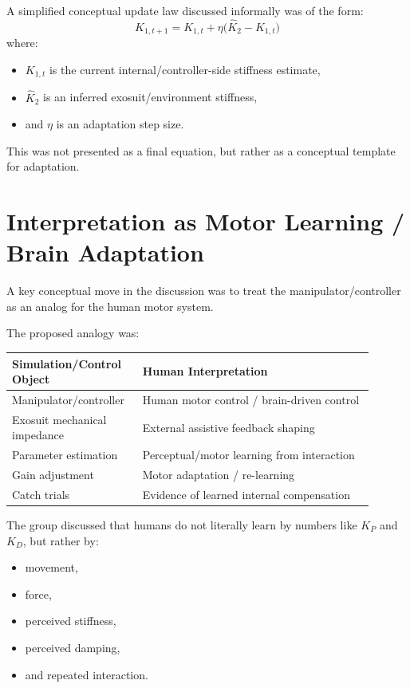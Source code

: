 \documentclass[11pt]{article}
\begin{document}
A simplified conceptual update law discussed informally was of the form:
\[
K_{1,t+1} = K_{1,t} + \eta\bigl(\hat{K}_2 - K_{1,t}\bigr)
\]
where:
\begin{itemize}[leftmargin=1.5em]
    \item \(K_{1,t}\) is the current internal/controller-side stiffness estimate,
    \item \(\hat{K}_2\) is an inferred exosuit/environment stiffness,
    \item and \(\eta\) is an adaptation step size.
\end{itemize}

This was not presented as a final equation, but rather as a conceptual template for adaptation.

\section{Interpretation as Motor Learning / Brain Adaptation}
A key conceptual move in the discussion was to treat the manipulator/controller as an analog for the human motor system.

The proposed analogy was:
\begin{center}
\begin{tabular}{>{\raggedright\arraybackslash}p{0.30\linewidth} >{\raggedright\arraybackslash}p{0.60\linewidth}}
\toprule
\textbf{Simulation/Control Object} & \textbf{Human Interpretation} \\
\midrule
Manipulator/controller & Human motor control / brain-driven control \\
Exosuit mechanical impedance & External assistive feedback shaping \\
Parameter estimation & Perceptual/motor learning from interaction \\
Gain adjustment & Motor adaptation / re-learning \\
Catch trials & Evidence of learned internal compensation \\
\bottomrule
\end{tabular}
\end{center}

The group discussed that humans do not literally learn by numbers like \(K_P\) and \(K_D\), but rather by:
\begin{itemize}[leftmargin=1.5em]
    \item movement,
    \item force,
    \item perceived stiffness,
    \item perceived damping,
    \item and repeated interaction.
\end{itemize}
\end{document}
